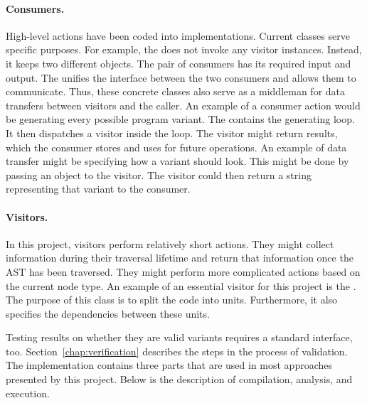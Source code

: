 \paragraph{Consumers.} High-level actions have been coded into 
 implementations.
Current  classes serve specific purposes.
For example, the   
does not invoke any visitor instances.
Instead, it keeps two different  objects.
The pair of consumers has its required input and output.
The  unifies the interface between the two 
consumers and allows them to communicate.
Thus, these concrete  classes also serve as a middleman for 
data transfers between visitors and the caller.
An example of a consumer action would be generating every possible program 
variant.
The  contains the generating loop.
It then dispatches a visitor inside the loop.
The visitor might return results, which the consumer stores and uses for 
future operations.
An example of data transfer might be specifying how a variant should look.
This might be done by passing an object to the visitor.
The visitor could then return a string representing that variant to 
the consumer.

\paragraph{Visitors.} In this project, visitors perform relatively short 
actions.
They might collect information during their traversal lifetime and return 
that information once the AST has been traversed.
They might perform more complicated  actions based on the 
current node type.
An example of an essential visitor for this project is 
the .
The purpose of this class is to split the code into units.
Furthermore, it also specifies the dependencies between these units.

Testing results on whether they are valid variants requires a standard 
interface, too.
Section~\ref{chap:verification} describes the steps in the process 
of validation.
The implementation contains three parts that are used in most approaches 
presented by this project.
Below is the description of compilation, analysis, and execution.

